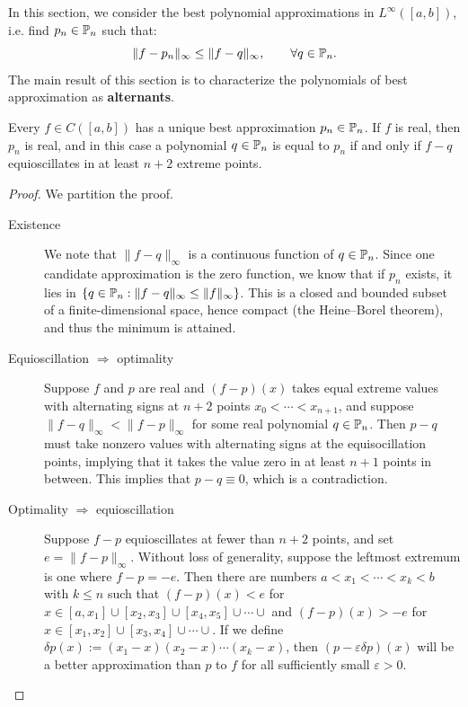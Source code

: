 In this section, we consider the best polynomial approximations in $L^\infty([a,b])$, i.e. find $p_n\in\P_n$ such that:
\[
\|f-p_n\|_\infty \le \|f-q\|_\infty,\qquad\forall q\in\P_n.
\]
The main result of this section is to characterize the polynomials of best approximation as {\bf alternants}.
\begin{theorem}\label{theorem:Equioscillation}
Every $f\in C([a,b])$ has a unique best approximation $p_n\in\P_n$. If $f$ is real, then $p_n$ is real, and in this case a polynomial $q\in\P_n$ is equal to $p_n$ if and only if $f-q$ equioscillates in at least $n+2$ extreme points.
\end{theorem}
\begin{proof}
We partition the proof.
\begin{description}
\item[Existence] We note that $\|f-q\|_\infty$ is a continuous function of $q\in\P_n$. Since one candidate approximation is the zero function, we know that if $p_n$ exists, it lies in $\{q\in\P_n : \|f-q\|_\infty \le \|f\|_\infty\}$. This is a closed and bounded subset of a finite-dimensional space, hence compact (the Heine--Borel theorem), and thus the minimum is attained.
\item[Equioscillation $\Longrightarrow$ optimality] Suppose $f$ and $p$ are real and $(f-p)(x)$ takes equal extreme values with alternating signs at $n+2$ points $x_0<\cdots<x_{n+1}$, and suppose $\|f-q\|_\infty < \|f-p\|_\infty$ for some real polynomial $q\in\P_n$. Then $p-q$ must take nonzero values with alternating signs at the equisocillation points, implying that it takes the value zero in at least $n+1$ points in between. This implies that $p-q\equiv0$, which is a contradiction.
\item[Optimality $\Longrightarrow$ equioscillation] Suppose $f-p$ equioscillates at fewer than $n+2$ points, and set $e = \|f-p\|_\infty$. Without loss of generality, suppose the leftmost extremum is one where $f-p = -e$. Then there are numbers $a < x_1 < \cdots < x_k < b$ with $k\le n$ such that $(f-p)(x) < e$ for $x\in[a,x_1]\cup[x_2,x_3]\cup[x_4,x_5]\cup\cdots\cup$ and $(f-p)(x)>-e$ for $x\in[x_1,x_2]\cup[x_3,x_4]\cup\cdots\cup$. If we define $\delta p(x) := (x_1-x)(x_2-x)\cdots(x_k-x)$, then $(p-\varepsilon\delta p)(x)$ will be a better approximation than $p$ to $f$ for all sufficiently small $\varepsilon>0$.

\end{description}
\end{proof}
